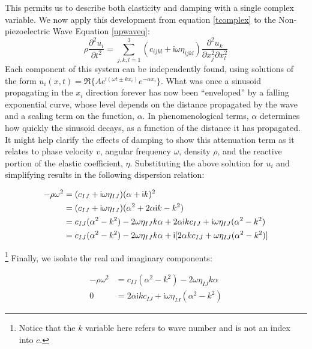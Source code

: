 \documentclass[a4paper,10pt]{report}
\numberwithin{equation}{section}
\begin{document}
This permits us to describe both elasticity and damping with a single complex variable. We now apply this development from equation \eqref{tcomplex} to the Non-piezoelectric Wave Equation \eqref{npwaveq}:
\begin{equation}\label{dampednpwe}
 \rho\frac{\partial^2 u_i}{\partial t^2} = \sum_{j,k,l=1}^3(c_{ijkl} + \mathsf{i}\omega\eta_{ijkl})\frac{\partial^2 u_k}{\partial x_j^2 \partial x_l^2}
\end{equation}
Each component of this system can be independently found, using solutions of the form $u_i(x, t) = \Re\{A e^{\mathsf{i}(\omega t \pm kx_i)}e^{-\alpha x_i}\}$. What was once a sinusoid propagating in the $x_i$ direction forever has now been ``enveloped'' by a falling exponential curve, whose level depends on the distance propagated by the wave and a scaling term on the function, $\alpha$. In phenomenological terms, $\alpha$ determines how quickly the sinusoid decays, as a function of the distance it has propagated. It might help clarify the effects of damping to show this attenuation term as it relates to phase velocity $v$, angular frequency $\omega$, density $\rho$, and the reactive portion of the elastic coefficient, $\eta$. Substituting the above solution for $u_i$ and simplifying results in the following dispersion relation\cite[p.~12]{Nelson1992}\cite[p.~22]{Ballantine1997}:
\begin{singlespace}
\begin{align}\label{ddispersion}
 -\rho\omega^2 &= (c_{IJ}+\mathsf{i}\omega\eta_{IJ})(\alpha + \mathsf{i}k)^2\notag \\
 &= (c_{IJ}+\mathsf{i}\omega\eta_{IJ})(\alpha^2 + 2\alpha\mathsf{i}k - k^2)\\
 &= c_{IJ}(\alpha^2 - k^2) - 2\omega\eta_{IJ}k\alpha + 2\alpha\mathsf{i} k c_{IJ} + \mathsf{i}\omega\eta_{IJ}(\alpha^2 - k^2)\notag \\
 &= c_{IJ}(\alpha^2 - k^2) - 2\omega\eta_{IJ}k\alpha + \mathsf{i}[2\alpha k c_{IJ} + \omega\eta_{IJ}(\alpha^2 - k^2)] \notag
\end{align}
\end{singlespace}
\footnote{Notice that the $k$ variable here refers to wave number and is not an index into $c$.} Finally, we isolate the real and imaginary components:
\begin{singlespace}
 \begin{align}
  -\rho\omega^2 &= c_{IJ}(\alpha^2 - k^2) - 2\omega\eta_{IJ}k\alpha\label{rdispersion}\\
  0 &= 2\alpha\mathsf{i} k c_{IJ} + \mathsf{i}\omega\eta_{IJ}(\alpha^2 - k^2)\label{idispersion}
 \end{align}
\end{singlespace}
\end{document}
